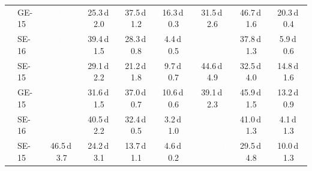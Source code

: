 \begin{table}[!htb]
\begin{tabular}{ll cccc @{\hspace{6pt}} ccc}
 & GE-15 & \cellcolor[HTML]{1663AA}\textcolor{white}{80.3\,{\tiny\textsf{d}\,}0.2} & \cellcolor[HTML]{C6DBEF}25.3\,{\tiny\textsf{d}\,}2.0 & \cellcolor[HTML]{9DCAE1}37.5\,{\tiny\textsf{d}\,}1.2 & \cellcolor[HTML]{D7E6F5}16.3\,{\tiny\textsf{d}\,}0.3 & \cellcolor[HTML]{B2D2E8}31.5\,{\tiny\textsf{d}\,}2.6 & \cellcolor[HTML]{79B5D9}46.7\,{\tiny\textsf{d}\,}1.6 & \cellcolor[HTML]{CFE1F2}20.3\,{\tiny\textsf{d}\,}0.4 \\
 & SE-16 & \cellcolor[HTML]{2070B4}\textcolor{white}{75.0\,{\tiny\textsf{d}\,}0.4} & \cellcolor[HTML]{97C6DF}39.4\,{\tiny\textsf{d}\,}1.5 & \cellcolor[HTML]{BCD7EB}28.3\,{\tiny\textsf{d}\,}0.8 & \cellcolor[HTML]{EEF5FC}4.4\,{\tiny\textsf{d}\,}0.5 & \cellcolor[HTML]{63A8D3}\textcolor{white}{52.5\,{\tiny\textsf{d}\,}2.2} & \cellcolor[HTML]{9DCAE1}37.8\,{\tiny\textsf{d}\,}1.3 & \cellcolor[HTML]{EBF3FB}5.9\,{\tiny\textsf{d}\,}0.6 \\
\addlinespace[2pt]
\multirow{3}{*}{\textbf{60--69}} & SE-15 & \cellcolor[HTML]{3A8AC2}\textcolor{white}{65.2\,{\tiny\textsf{d}\,}2.2} & \cellcolor[HTML]{B9D6EA}29.1\,{\tiny\textsf{d}\,}2.2 & \cellcolor[HTML]{CDE0F1}21.2\,{\tiny\textsf{d}\,}1.8 & \cellcolor[HTML]{E4EFF9}9.7\,{\tiny\textsf{d}\,}0.7 & \cellcolor[HTML]{81BADB}44.6\,{\tiny\textsf{d}\,}4.9 & \cellcolor[HTML]{AED1E7}32.5\,{\tiny\textsf{d}\,}4.0 & \cellcolor[HTML]{DAE8F6}14.8\,{\tiny\textsf{d}\,}1.6 \\
 & GE-15 & \cellcolor[HTML]{1562A9}\textcolor{white}{80.7\,{\tiny\textsf{d}\,}1.0} & \cellcolor[HTML]{B2D2E8}31.6\,{\tiny\textsf{d}\,}1.5 & \cellcolor[HTML]{A0CBE2}37.0\,{\tiny\textsf{d}\,}0.7 & \cellcolor[HTML]{E2EDF8}10.6\,{\tiny\textsf{d}\,}0.6 & \cellcolor[HTML]{97C6DF}39.1\,{\tiny\textsf{d}\,}2.3 & \cellcolor[HTML]{7CB7DA}45.9\,{\tiny\textsf{d}\,}1.5 & \cellcolor[HTML]{DDEAF7}13.2\,{\tiny\textsf{d}\,}0.9 \\
 & SE-16 & \cellcolor[HTML]{1966AD}\textcolor{white}{79.1\,{\tiny\textsf{d}\,}1.3} & \cellcolor[HTML]{92C4DE}40.5\,{\tiny\textsf{d}\,}2.2 & \cellcolor[HTML]{AFD1E7}32.4\,{\tiny\textsf{d}\,}0.5 & \cellcolor[HTML]{F1F7FD}3.2\,{\tiny\textsf{d}\,}1.0 & \cellcolor[HTML]{66ABD4}\textcolor{white}{51.3\,{\tiny\textsf{d}\,}3.6} & \cellcolor[HTML]{91C3DE}41.0\,{\tiny\textsf{d}\,}1.3 & \cellcolor[HTML]{EFF6FC}4.1\,{\tiny\textsf{d}\,}1.3 \\
\addlinespace[2pt]
\multirow{3}{*}{\textbf{70+}} & SE-15 & \cellcolor[HTML]{7AB6D9}46.5\,{\tiny\textsf{d}\,}3.7 & \cellcolor[HTML]{C8DCF0}24.2\,{\tiny\textsf{d}\,}3.1 & \cellcolor[HTML]{DCE9F6}13.7\,{\tiny\textsf{d}\,}1.1 & \cellcolor[HTML]{EEF5FC}4.6\,{\tiny\textsf{d}\,}0.2 & \cellcolor[HTML]{64A9D3}\textcolor{white}{52.0\,{\tiny\textsf{d}\,}10.9} & \cellcolor[HTML]{B8D5EA}29.5\,{\tiny\textsf{d}\,}4.8 & \cellcolor[HTML]{E3EEF9}10.0\,{\tiny\textsf{d}\,}1.3 \\

\end{tabular}
\end{table}
